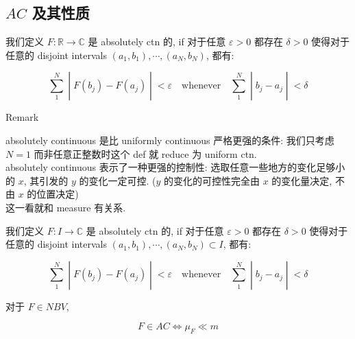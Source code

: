 \subsection{\texorpdfstring{\(AC\) 及其性质}{AC 及其性质}}\label{ac-ux53caux5176ux6027ux8d28}

\begin{definition}{}

我们定义 \(F:\mathbb{R}\rightarrow\mathbb{C}\) 是 absolutely ctn 的, if 对于任意 \(\varepsilon > 0\) 都存在 \(\delta > 0\) 使得对于任意的 disjoint intervals \((a_{1},b_{1}),\cdots,(a_{N},b_{N})\), 都有:

\[\left. \sum\limits_{1}^{N} \middle| F(b_{j}) - F(a_{j}) \middle| < \varepsilon\quad\text{whenever}\quad\sum\limits_{1}^{N} \middle| b_{j} - a_{j} \middle| < \delta \right.\]

\end{definition}

\begin{qlremark}{Remark}

absolutely continuous 是比 uniformly continuous 严格更强的条件: 我们只考虑 \(N = 1\) 而非任意正整数时这个 def 就 reduce 为 uniform ctn.\\
absolutely continuous 表示了一种更强的控制性: 选取任意一些地方的变化足够小的 \(x\), 其引发的 \(y\) 的变化一定可控. (\(y\) 的变化的可控性完全由 \(x\) 的变化量决定, 不由 \(x\) 的位置决定)\\
这一看就和 measure 有关系.

\end{qlremark}

\begin{definition}{}

我们定义 \(F:I\rightarrow\mathbb{C}\) 是 absolutely ctn 的, if 对于任意 \(\varepsilon > 0\) 都存在 \(\delta > 0\) 使得对于任意的 disjoint intervals \((a_{1},b_{1}),\cdots,(a_{N},b_{N}) \subset I\), 都有:

\[\left. \sum\limits_{1}^{N} \middle| F(b_{j}) - F(a_{j}) \middle| < \varepsilon\quad\text{whenever}\quad\sum\limits_{1}^{N} \middle| b_{j} - a_{j} \middle| < \delta \right.\]

\end{definition}

\begin{lemma}{}

对于 \(F \in NBV\),

\[F \in AC\Leftrightarrow\mu_{F} \ll m\]

\end{lemma}

